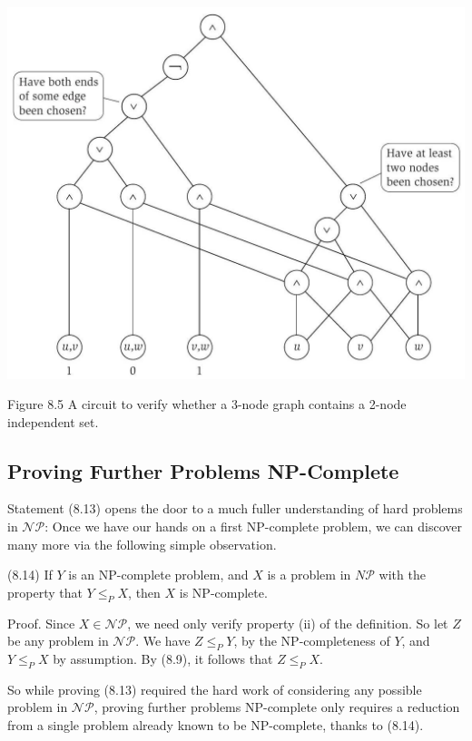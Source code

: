 \documentclass[a4paper, 12pt]{book}
\theoremstyle{dotless}
\begin{document}
\begin{center}
\includegraphics[width=\textwidth]{2023_01_31_a1ea3121d626c5d81538g-20}
\end{center}

Figure 8.5 A circuit to verify whether a 3-node graph contains a 2-node independent set.

\subsection{Proving Further Problems NP-Complete}
Statement (8.13) opens the door to a much fuller understanding of hard problems in $\mathcal{N} \mathcal{P}$: Once we have our hands on a first NP-complete problem, we can discover many more via the following simple observation.

(8.14) If $Y$ is an NP-complete problem, and $X$ is a problem in $N \mathcal{P}$ with the property that $Y \leq_{P} X$, then $X$ is NP-complete.

Proof. Since $X \in \mathcal{N P}$, we need only verify property (ii) of the definition. So let $Z$ be any problem in $\mathcal{N P}$. We have $Z \leq_{P} Y$, by the NP-completeness of $Y$, and $Y \leq_{P} X$ by assumption. By (8.9), it follows that $Z \leq_{P} X$.

So while proving (8.13) required the hard work of considering any possible problem in $\mathcal{N P}$, proving further problems NP-complete only requires a reduction from a single problem already known to be NP-complete, thanks to (8.14).
\end{document}
